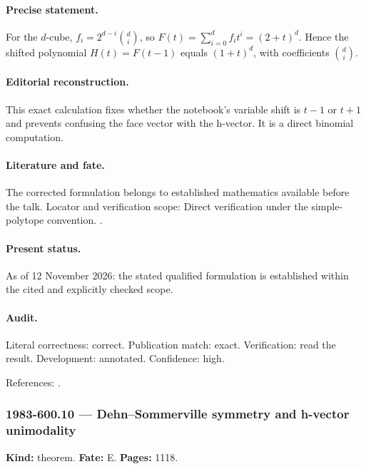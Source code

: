 \paragraph{Precise statement.} For the \(d\)-cube, \(f_i=2^{d-i}\binom di\), so \(F(t)=\sum_{i=0}^df_it^i=(2+t)^d\). Hence the shifted polynomial \(H(t)=F(t-1)\) equals \((1+t)^d\), with coefficients \(\binom di\).

\paragraph{Editorial reconstruction.} This exact calculation fixes whether the notebook's variable shift is \(t-1\) or \(t+1\) and prevents confusing the face vector with the h-vector. It is a direct binomial computation.

\paragraph{Literature and fate.} The corrected formulation belongs to established mathematics available before the talk. Locator and verification scope: Direct verification under the simple-polytope convention. \cite{stanley1980faces}.

\paragraph{Present status.} As of 12 November 2026: the stated qualified formulation is established within the cited and explicitly checked scope.

\paragraph{Audit.} Literal correctness: correct. Publication match: exact. Verification: read the result. Development: annotated. Confidence: high.

\noindent References: \citep{stanley1980faces}.\par

\subsubsection{1983-600.10 --- Dehn--Sommerville symmetry and h-vector unimodality}

\label{item:1983-600.10}

\noindent\textbf{Kind:} theorem. \textbf{Fate:} E. \textbf{Pages:} 1118.\par

